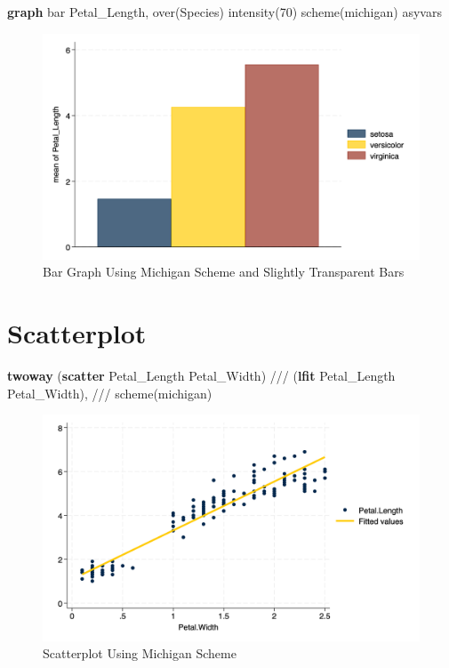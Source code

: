 \documentclass[
  letterpaper,
  DIV=11,
  numbers=noendperiod]{scrartcl}
\newenvironment{Shaded}{\begin{snugshade}}{\end{snugshade}}
\newcommand{\BaseNTok}[1]{\textcolor[rgb]{0.68,0.00,0.00}{#1}}
\newcommand{\CommentTok}[1]{\textcolor[rgb]{0.37,0.37,0.37}{#1}}
\newcommand{\DecValTok}[1]{\textcolor[rgb]{0.68,0.00,0.00}{#1}}
\newcommand{\KeywordTok}[1]{\textcolor[rgb]{0.00,0.23,0.31}{\textbf{#1}}}
\newcommand{\NormalTok}[1]{\textcolor[rgb]{0.00,0.23,0.31}{#1}}
\begin{document}
\begin{Shaded}
\begin{Highlighting}[]
\KeywordTok{graph} \BaseNTok{bar}\NormalTok{ Petal\_Length, }\BaseNTok{over}\NormalTok{(Species) intensity(70) }\DecValTok{scheme}\NormalTok{(michigan) asyvars}
\end{Highlighting}
\end{Shaded}

\begin{figure}[H]

{\centering \includegraphics[width=0.5\linewidth,height=\textheight,keepaspectratio]{mybargraph2.png}

}

\caption{Bar Graph Using Michigan Scheme and Slightly Transparent Bars}

\end{figure}%

\section{Scatterplot}\label{scatterplot}

\begin{Shaded}
\begin{Highlighting}[]
\KeywordTok{twoway}\NormalTok{ (}\KeywordTok{scatter}\NormalTok{ Petal\_Length Petal\_Width) }\CommentTok{///}
\NormalTok{(}\KeywordTok{lfit}\NormalTok{ Petal\_Length Petal\_Width), }\CommentTok{///}
\DecValTok{scheme}\NormalTok{(michigan)}
\end{Highlighting}
\end{Shaded}

\begin{figure}[H]

{\centering \includegraphics[width=0.5\linewidth,height=\textheight,keepaspectratio]{myscatter.png}

}

\caption{Scatterplot Using Michigan Scheme}

\end{figure}%
\end{document}
